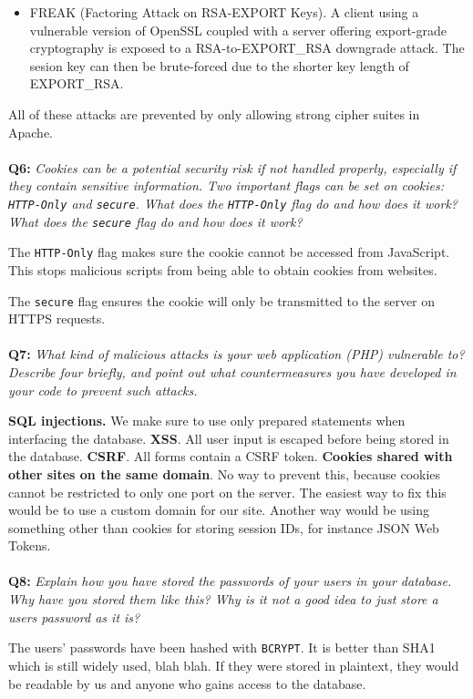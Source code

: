 \begin{itemize}
    \item
        FREAK (Factoring Attack on RSA-EXPORT Keys)\cite{freak-ssl-tls}.
        A client using a vulnerable version of OpenSSL coupled with a server offering export-grade cryptography is exposed to a RSA-to-EXPORT\_RSA downgrade attack.
        The sesion key can then be brute-forced due to the shorter key length of EXPORT\_RSA.

\end{itemize}

All of these attacks are prevented by only allowing strong cipher suites in Apache.

\paragraph{}
\textbf{Q6:}
\cprotect\textit{Cookies can be a potential security risk if not handled properly, especially if they contain sensitive information. Two important flags can be set on cookies: \verb/HTTP-Only/ and \verb/secure/. What does the \verb/HTTP-Only/ flag do and how does it work? What does the \verb/secure/ flag do and how does it work?}

The \verb/HTTP-Only/ flag makes sure the cookie cannot be accessed from JavaScript. This stops malicious scripts from being able to obtain cookies from websites.

The \verb/secure/ flag ensures the cookie will only be transmitted to the server on HTTPS requests.

\paragraph{}
\textbf{Q7:}
\textit{What kind of malicious attacks is your web application (PHP) vulnerable to? Describe four briefly, and point out what countermeasures you have developed in your code to prevent such attacks.}

\textbf{SQL injections.} We make sure to use only prepared statements when interfacing the database.
\textbf{XSS}. All user input is escaped before being stored in the database.
\textbf{CSRF}. All forms contain a CSRF token.
\textbf{Cookies shared with other sites on the same domain}. No way to prevent this, because cookies cannot be restricted to only one port on the server.
The easiest way to fix this would be to use a custom domain for our site.
Another way would be using something other than cookies for storing session IDs, for instance JSON Web Tokens.

\paragraph{}
\textbf{Q8:}
\textit{Explain how you have stored the passwords of your users in your database. Why have you stored them like this? Why is it not a good idea to just store a users password as it is?}

The users' passwords have been hashed with \verb/BCRYPT/.
It is better than SHA1 which is still widely used, blah blah.
If they were stored in plaintext, they would be readable by us and anyone who gains access to the database.
